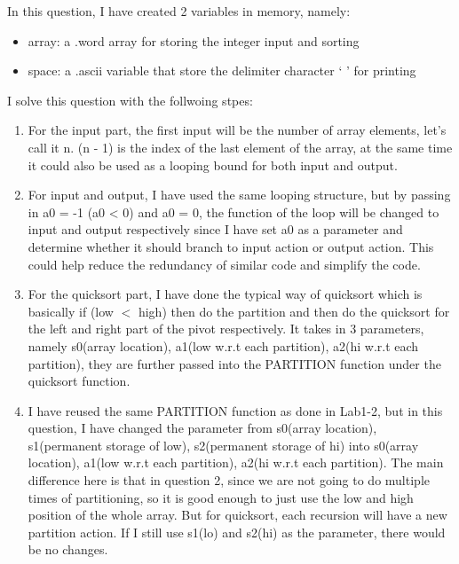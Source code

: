 \documentclass[10pt,a4paper]{article}
\begin{document}
\pagebreak

\begin{ans}

	\noindent In this question, I have created 2 variables in memory, namely:
	\begin{itemize}
		\item array: a .word array for storing the integer input and sorting
		\item space: a .ascii variable that store the delimiter character ` ' for printing
	\end{itemize}
	\noindent I solve this question with the follwoing stpes: 
	\begin{enumerate}
		\item For the input part, the first input will be the number of array elements, let's call it n. (n - 1) is the index of the last element of the array, at the same time it could also be used as a looping bound for both input and output. 
		\item For input and output, I have used the same looping structure, but by passing in a0 = -1 (a0 < 0) and a0 = 0, the function of the loop will be changed to input and output respectively since I have set a0 as a parameter and determine whether it should branch to input action or output action. 
			This could help reduce the redundancy of similar code and simplify the code. 
		\item For the quicksort part, I have done the typical way of quicksort which is basically if (low $<$ high) then do the partition and then do the quicksort for the left and right part of the pivot respectively. It takes in 3 parameters, namely s0(array location), a1(low w.r.t each partition), a2(hi w.r.t each partition), 
			they are further passed into the PARTITION function under the quicksort function. 
		\item I have reused the same PARTITION function as done in Lab1-2, but in this question, I have changed the parameter from s0(array location), s1(permanent storage of low), s2(permanent storage of hi) into s0(array location), a1(low w.r.t each partition), a2(hi w.r.t each partition). 
		The main difference here is that in question 2, since we are not going to do multiple times of partitioning, so it is good enough to just use the low and high position of the whole array. But for quicksort, each recursion will have a new partition action. If I still use s1(lo) and s2(hi) as the parameter, there would be no changes. 

\end{enumerate}
\end{ans}
\end{document}
